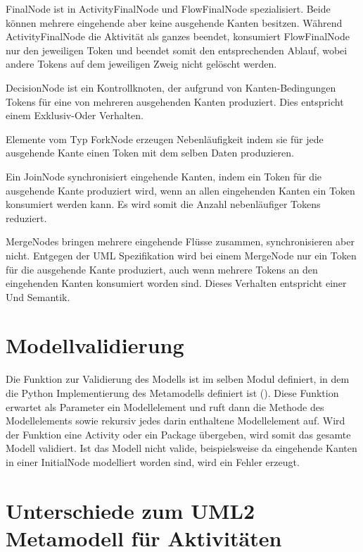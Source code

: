 FinalNode ist in ActivityFinalNode und FlowFinalNode spezialisiert. Beide können mehrere eingehende aber keine ausgehende Kanten besitzen. Während ActivityFinalNode die Aktivität als ganzes beendet, konsumiert FlowFinalNode nur den jeweiligen Token und beendet somit den entsprechenden Ablauf, wobei andere Tokens auf dem jeweiligen Zweig nicht gelöscht werden.

DecisionNode ist ein Kontrollknoten, der aufgrund von Kanten-Bedingungen Tokens für eine von mehreren ausgehenden Kanten produziert. Dies entspricht einem Exklusiv-Oder Verhalten.

Elemente vom Typ ForkNode erzeugen Nebenläufigkeit indem sie für jede ausgehende Kante einen Token mit dem selben Daten produzieren.

Ein JoinNode synchronisiert eingehende Kanten, indem ein Token für die ausgehende Kante produziert wird, wenn an allen eingehenden Kanten ein Token konsumiert werden kann. Es wird somit die Anzahl nebenläufiger Tokens reduziert.

MergeNodes bringen mehrere eingehende Flüsse zusammen, synchronisieren aber nicht. Entgegen der UML Spezifikation wird bei einem MergeNode nur ein Token für die ausgehende Kante produziert, auch wenn mehrere Tokens an den eingehenden Kanten konsumiert worden sind. Dieses Verhalten entspricht einer Und Semantik.



\section{Modellvalidierung}
Die Funktion zur Validierung des Modells  ist im selben Modul definiert, in dem die Python Implementierung des Metamodells definiert ist (). Diese Funktion erwartet als Parameter ein Modellelement und ruft dann die Methode  des Modellelements sowie rekursiv jedes darin enthaltene Modellelement auf. Wird der Funktion eine Activity oder ein Package übergeben, wird somit das gesamte Modell validiert. Ist das Modell nicht valide, beispielsweise da eingehende Kanten in einer InitialNode modelliert worden sind, wird ein Fehler erzeugt.


\section{Unterschiede zum UML2 Metamodell für Aktivitäten}\label{amrep-metamodel-diff}

